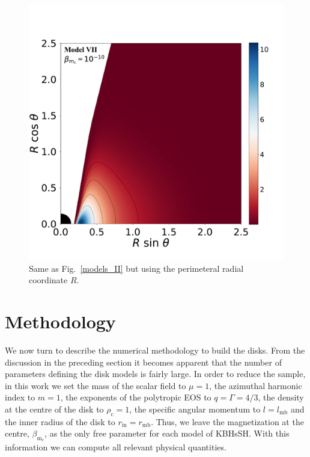 \documentclass[twocolumn,aps,showpacs,showkeys,prd,superscriptaddress,byrevtex, amsmath]{revtex4-1}
\begin{document}
\begin{figure}
\hspace{-0.2cm}
\includegraphics[scale=0.14]{figures/fig4_VII__10.pdf}
\hspace{-0.2cm}
\caption{Same as Fig.~\ref{models_II} but using the perimeteral radial coordinate $R$.}
\label{models_peri_II}
\end{figure}

\section{Methodology}
\label{procedure}

We now turn to describe the numerical methodology to build the disks. From the discussion in the preceding section it becomes apparent that the number of parameters defining the disk models is fairly large. In order to reduce the sample, in this work we set the mass of the scalar field to $\mu = 1$, the  azimuthal harmonic index to $m = 1$, the exponents of the polytropic EOS to $q = \Gamma = 4/3$, the density at the centre of the disk to $\rho_{\mathrm{c}} = 1$, the specific angular momentum to $l = l_{\mathrm{mb}}$ and the inner radius of the disk to $r_{\mathrm{in}} = r_{\mathrm{mb}}$. Thus, we leave the magnetization at the centre, $\beta_{\mathrm{m_c}}$, as the only free parameter for each model of KBHsSH. With this information we can compute all relevant physical quantities.
\end{document}
